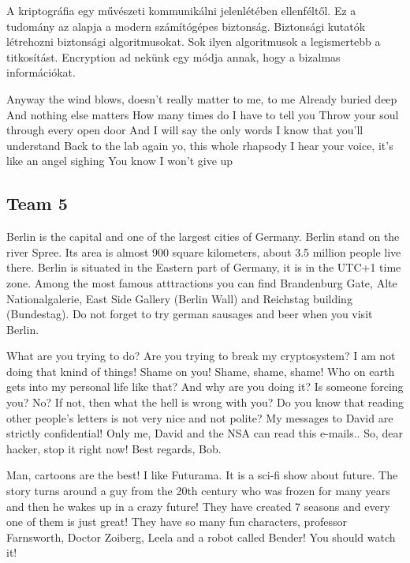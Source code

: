 \documentclass[a4paper,11pt]{article}
\begin{document}
\begin{displayquote}
A kriptográfia egy művészeti kommunikálni jelenlétében ellenféltől. Ez a tudomány az alapja a modern számítógépes biztonság. Biztonsági kutatók létrehozni biztonsági algoritmusokat. Sok ilyen algoritmusok a legismertebb a titkosítást. Encryption ad nekünk egy módja annak, hogy a bizalmas információkat.
\end{displayquote}

\begin{displayquote}
Anyway the wind blows, doesn't really matter to me, to me
Already buried deep
And nothing else matters
How many times do I have to tell you
Throw your soul through every open door
And I will say the only words I know that you'll understand
Back to the lab again yo, this whole rhapsody
I hear your voice, it's like an angel sighing
You know I won't give up
\end{displayquote}

\newpage
\subsection{Team 5}
\begin{displayquote}
Berlin is the capital and one of the largest cities of Germany.
Berlin stand on the river Spree. Its area is almost 900 square kilometers,
about 3.5 million people live there. Berlin is situated in the Eastern part of Germany,
it is in the UTC+1 time zone.
Among the most famous atttractions you can find
Brandenburg Gate, Alte Nationalgalerie, East Side Gallery (Berlin Wall)
and Reichstag building (Bundestag). Do not forget to try german sausages and beer when you visit Berlin.
\end{displayquote}

\begin{displayquote}
What are you trying to do? Are you trying to break my cryptosystem?
I am not doing that knind of things! Shame on you! Shame, shame, shame!
Who on earth gets into my personal life like that? And why are you doing it?
Is someone forcing you? No? If not, then what the hell is wrong with you?
Do you know that reading other people's letters is not very nice and not polite?
My messages to David are strictly confidential! Only me, David and the NSA can read this e-mails..
So, dear hacker, stop it right now!
Best regards,
Bob.
\end{displayquote}

\begin{displayquote}
Man, cartoons are the best! I like Futurama.
It is a sci-fi show about future. The story turns around a guy from the 20th century
who was frozen for many years and then he wakes up in a crazy future!
They have created 7 seasons and every one of them is just great!
They have so many fun characters, professor Farnsworth, Doctor Zoiberg, Leela
and a robot called Bender! You should watch it!
\end{displayquote}
\end{document}
